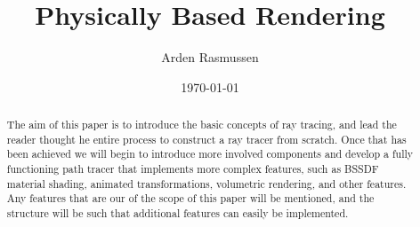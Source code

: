 \documentclass[10pt]{amsart}
\title{Physically Based Rendering}
\author{Arden Rasmussen}
\date{\today}
\begin{document}
\maketitle

\begin{abstract}
  The aim of this paper is to introduce the basic concepts of ray tracing, and
  lead the reader thought he entire process to construct a ray tracer from
  scratch. Once that has been achieved we will begin to introduce more involved
  components and develop a fully functioning path tracer that implements more
  complex features, such as BSSDF material shading, animated transformations,
  volumetric rendering, and other features. Any features that are our of the
  scope of this paper will be mentioned, and the structure will be such that
  additional features can easily be implemented.
\end{abstract}

\begin{multicols}{2}




\end{multicols}
\end{document}

